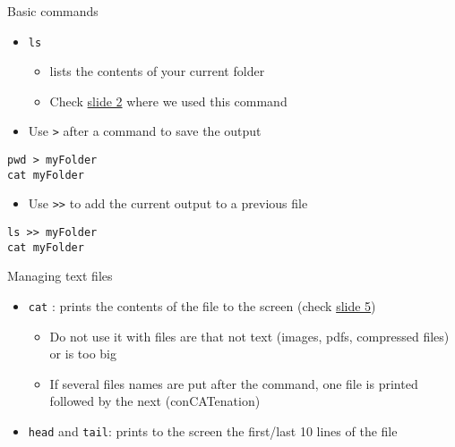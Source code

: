 \documentclass[
  ignorenonframetext,
]{beamer}
\providecommand{\tightlist}{%
  \setlength{\itemsep}{0pt}\setlength{\parskip}{0pt}}
\begin{document}
\begin{frame}[fragile]{Basic commands}
\protect\hypertarget{slide7}{}
\begin{itemize}[<+->]
\tightlist
\item
  {\texttt{ls}}

  \begin{itemize}[<+->]
  \tightlist
  \item
    lists the contents of your current folder
  \item
    Check \protect\hyperlink{2}{slide 2} where we used this command
  \end{itemize}
\item
  Use {\texttt{\textgreater{}}} after a command to save the output
\end{itemize}

\begin{block}{}
\protect\hypertarget{section-6}{}
\begin{verbatim}
pwd > myFolder
cat myFolder
\end{verbatim}
\end{block}

\begin{block}{}
\protect\hypertarget{section-7}{}
\begin{itemize}[<+->]
\tightlist
\item
  Use {\texttt{\textgreater{}\textgreater{}}} to add the current output
  to a previous file
\end{itemize}
\end{block}

\begin{block}{}
\protect\hypertarget{section-8}{}
\begin{verbatim}
ls >> myFolder
cat myFolder
\end{verbatim}
\end{block}

\begin{block}{}
\protect\hypertarget{section-9}{}
\end{block}
\end{frame}

\begin{frame}[fragile]{Managing text files}
\protect\hypertarget{slide8}{}
\begin{itemize}[<+->]
\tightlist
\item
  {\texttt{cat}} : prints the contents of the file to the screen (check
  \protect\hyperlink{5}{slide 5})

  \begin{itemize}[<+->]
  \tightlist
  \item
    Do not use it with files are that not text (images, pdfs, compressed
    files) or is too big
  \item
    If several files names are put after the command, one file is
    printed followed by the next (conCATenation)
  \end{itemize}
\item
  {\texttt{head}} and {\texttt{tail}}: prints to the screen the
  first/last 10 lines of the file
\end{itemize}
\end{frame}
\end{document}
